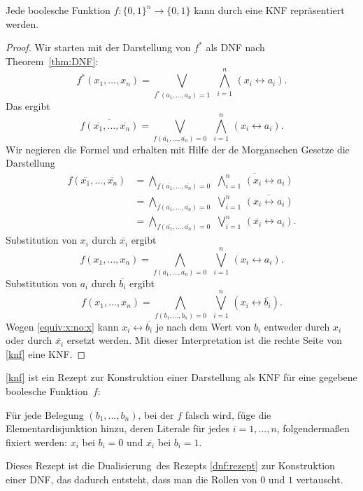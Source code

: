 \begin{thm}
	Jede boolesche Funktion $f : \{0,1\}^n \to \{0,1\}$ kann durch eine KNF repräsentiert werden. 
\end{thm} 
\begin{proof}
		Wir starten mit der Darstellung von $f^\ast$ als DNF nach Theorem~\ref{thm:DNF}:
		\[
			f^\ast(x_1,\ldots,x_n) = \bigvee_{f^\ast(a_1,\ldots,a_n)=1} \ \, \bigwedge_{i=1}^n \, (x_i \leftrightarrow a_i).
		\]
		Das ergibt 
		\[
			\overline{ f(\overline{x_1},\ldots,\overline{x_n})} = \bigvee_{f(\overline{a_1},\ldots,\overline{a_n}) = 0} \ \, \bigwedge_{i=1}^n  \, (x_i \leftrightarrow a_i). 
		\]
		\condclearpage
		\noindent Wir negieren die Formel und erhalten mit Hilfe der de Morganschen Gesetze die Darstellung 
		\begin{align*}
				f(\overline{x_1},\ldots,\overline{x_n}) &= \bigwedge_{f(\overline{a_1},\ldots,\overline{a_n})=0} \ \, \overline{\bigwedge_{i=1}^n  \, (x_i \leftrightarrow a_i)} \\
				&= \bigwedge_{f(\overline{a_1},\ldots,\overline{a_n})=0} \ \, \bigvee_{i=1}^n  \, \overline{(x_i \leftrightarrow a_i)}\\
				&= \bigwedge_{f(\overline{a_1},\ldots,\overline{a_n})=0} \ \, \bigvee_{i=1}^n  \, (\overline{x_i} \leftrightarrow a_i). 
		\end{align*}
		\condclearpage
		\noindent Substitution von $x_i$ durch $\overline{x_i}$ ergibt 
		\[
				f(x_1,\ldots,x_n) = \bigwedge_{f(\overline{a_1},\ldots,\overline{a_n})=0} \ \, \bigvee_{i=1}^n  \, (x_i \leftrightarrow a_i).
		\]
		Substitution von $a_i$ durch $\overline{b_i}$ ergibt
		\begin{equation} \label{knf} 
			f(x_1,\ldots,x_n) = \bigwedge_{f(b_1,\ldots,b_n)=0} \ \, \bigvee_{i=1}^n  \, (x_i \leftrightarrow \overline{b_i}).
		\end{equation}
		Wegen \eqref{equiv:x:no:x} kann $x_i \leftrightarrow \overline{b_i}$ je nach dem Wert von $b_i$ entweder durch $x_i$ oder durch $\overline{x_i}$ ersetzt werden. Mit dieser Interpretation ist die rechte Seite von \eqref {knf} eine KNF. 
\end{proof} 

\begin{bem}
	\eqref{knf} ist ein Rezept zur Konstruktion einer Darstellung als KNF für eine gegebene boolesche Funktion~$f$:
	
	Für jede Belegung $(b_1,\ldots,b_n)$, bei der $f$ falsch wird, füge die Elementardisjunktion hinzu, deren Literale für jedes $i=1,\ldots,n$, folgendermaßen fixiert werden: $x_i$ bei $b_i=0$ und $\overline{x_i}$ bei $b_i=1$.
	
	Dieses Rezept ist die \glqq Dualisierung\grqq\ des Rezepts \eqref{dnf:rezept} zur Konstruktion einer DNF, das dadurch entsteht, dass man die Rollen von $0$ und $1$ vertauscht. 
\end{bem} 



